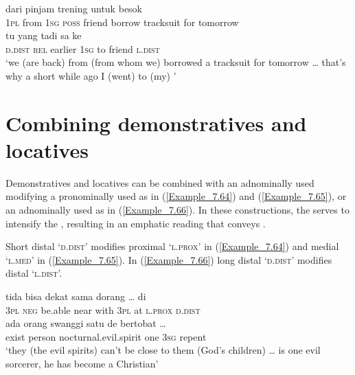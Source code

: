 {\ea
\label{Example_7.63}
 {{dari}} {} {{}} {{}} {{pinjam}} {{trening}} {untuk} {besok}\\ %
 {\textsc{1pl}}  {from}  \textsc{1sg}  {\textsc{poss}}  {friend}  {borrow}  {tracksuit}  for  tomorrow\\
\gll {\ldots}  {tu}  {yang}  {tadi}  sa  {ke}  {}  {}\\
  { }  {\textsc{d.dist}}  {\textsc{rel}}  {earlier}  \textsc{1sg}  {to}  {friend}  {\textsc{l.dist}}\\
\glt
‘we (are back) from  (from whom we) borrowed a tracksuit for tomorrow {\ldots} that’s why a short while ago I (went) to (my) ’ \textstyleExampleSource{[081011-020-Cv.0052/0056]}
\z


\section{Combining demonstratives and locatives}
\label{Para_7.3}
Demonstratives and locatives can be combined with an adnominally used  modifying a pronominally used  as in (\ref{Example_7.64}) and (\ref{Example_7.65}), or an adnominally used  as in (\ref{Example_7.66}). In these constructions, the  serves to intensify the , resulting in an emphatic reading that conveys .



Short distal  ‘\textsc{d.dist}’ modifies proximal  ‘\textsc{l.prox}’ in (\ref{Example_7.64}) and medial  ‘\textsc{l.med}’ in (\ref{Example_7.65}). In (\ref{Example_7.66}) long distal  ‘\textsc{d.dist}’ modifies distal  ‘\textsc{l.dist}’.

\ea
\label{Example_7.64}
 {tida} {{bisa}} {dekat} {{sama}} {{dorang}} {\ldots} {di} {{}} {}\\ %
 {\textsc{3pl}}  \textsc{neg}  {be.able}  near  {with}  {\textsc{3pl}}   { }  at  {\textsc{l.prox}}  \textsc{d.dist}\\
\gll ada  {orang}  {swanggi}  {satu}  {de}  {bertobat}  {\ldots}\\
 exist  {person}  {nocturnal.evil.spirit}  {one}  {\textsc{3sg}}  {repent}  { }\\
\glt 
‘they (the evil spirits) can’t be close to them (God’s children) {\ldots} \bluebold{)} is one evil sorcerer, he has become a Christian’ \textstyleExampleSource{[081006-022-CvEx.0146/0150]}
\z

}
